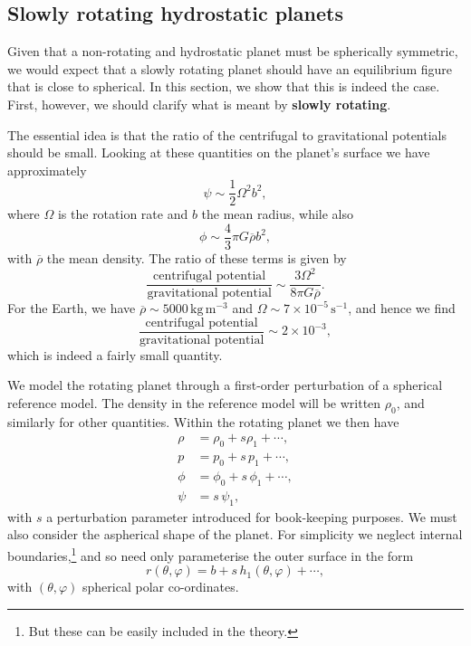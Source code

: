 \subsection*{Slowly rotating hydrostatic planets}
Given that a non-rotating and hydrostatic planet must be spherically symmetric, we would expect that a slowly rotating planet 
should have an equilibrium figure that is close to spherical. In this section, we show that this is indeed the case. First, 
however, we should clarify what is meant by \textbf{slowly rotating}. 

The essential idea is that the ratio of the centrifugal to gravitational potentials should be small. 
Looking at these quantities on the planet's surface we have approximately
\begin{equation}
\psi\sim\frac{1}{2}\Omega^{2}b^{2},
\label{eq:13}
\end{equation}
where $\Omega$ is the rotation rate and $b$ the mean radius, while also
\begin{equation}
\phi\sim\frac{4}{3}\pi G\overline{\rho}b^{2},
\label{eq:14}
\end{equation}
with $\overline{\rho}$ the mean density. The ratio of these terms is given by
\begin{equation}
\frac{\text{centrifugal potential}}{\text{gravitational potential}}\sim\frac{3\Omega^{2}}{8\pi G\overline{\rho}}.
\label{eq:15}
\end{equation}
For the Earth, we have $\overline{\rho}\sim5000\,\mathrm{kg\,m^{-3}}$ and $\Omega\sim7\times10^{-5}\,\mathrm{s^{-1}}$, and hence we find
\begin{equation}
\frac{\text{centrifugal potential}}{\text{gravitational potential}}\sim2\times10^{-3},
\label{eq:16}
\end{equation}
which is indeed a fairly small quantity.

We model the rotating planet through a first-order perturbation of a spherical reference model. The density in 
the reference model will be written $\rho_{0}$, and similarly for other quantities. Within the rotating planet we then have
\begin{align}
\rho&=\rho_{0}+s\rho_{1}+\cdots, \label{eq:17}\\
p&=p_{0}+s\,p_{1}+\cdots, \label{eq:18}\\
\phi&=\phi_{0}+s\,\phi_{1}+\cdots, \label{eq:19}\\
\psi&=s\,\psi_{1}, \label{eq:20}
\end{align}
with $s$ a perturbation parameter introduced for book-keeping purposes. We must also consider the aspherical shape of the planet. 
For simplicity we neglect internal boundaries,\footnote{But these can be easily included in the theory.} and so need only 
parameterise the outer surface in the form
\begin{equation}
r(\theta,\varphi)=b+s\,h_{1}(\theta,\varphi)+\cdots,
\label{eq:21}
\end{equation}
with $(\theta,\varphi)$ spherical polar co-ordinates. 

